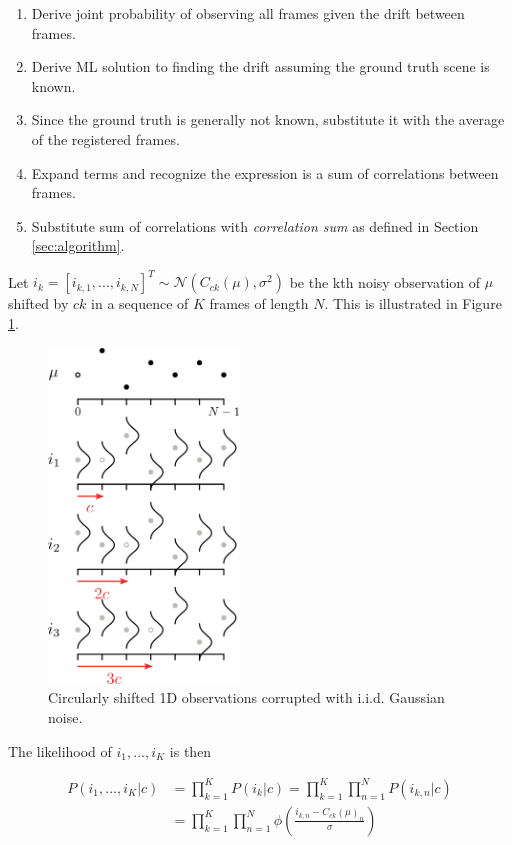 \documentclass[tocnosub,noragright,centerchapter,12pt]{uiucecethesis09}
\begin{document}
\begin{enumerate}
  \item Derive joint probability of observing all frames given the drift between frames.
  \item Derive ML solution to finding the drift assuming the ground truth scene is known.
  \item Since the ground truth is generally not known, substitute it with the average of the registered frames.
  \item Expand terms and recognize the expression is a sum of correlations between frames.
  \item Substitute sum of correlations with \emph{correlation sum} as defined in Section \ref{sec:algorithm}.
\end{enumerate}

Let $i_k = \left[i_{k,1}, ..., i_{k,N}\right]^T \sim \mathcal{N}(C_{ck}(\mu), \sigma^2)$ be the kth noisy observation of $\mu$ shifted by $ck$ in a sequence of $K$ frames of length $N$.  This is illustrated in Figure \ref{fig:multiframecirc}.

\begin{figure}
  \centering
  \includegraphics[width=0.45\textwidth]{figures/multiframecirc.png}
  \caption{Circularly shifted 1D observations corrupted with i.i.d. Gaussian noise.}
  \label{fig:multiframecirc}
\end{figure}

The likelihood of $i_1, ..., i_K$ is then

\begin{align*}
P(i_1, ..., i_K | c) &= \prod_{k=1}^K P(i_k | c) = \prod_{k=1}^K \prod_{n=1}^N P(i_{k,n} | c) \\
&= \prod_{k=1}^K \prod_{n=1}^N \phi \left(\frac{i_{k,n} - C_{ck}(\mu)_n}{\sigma} \right)
\end{align*}
\end{document}
